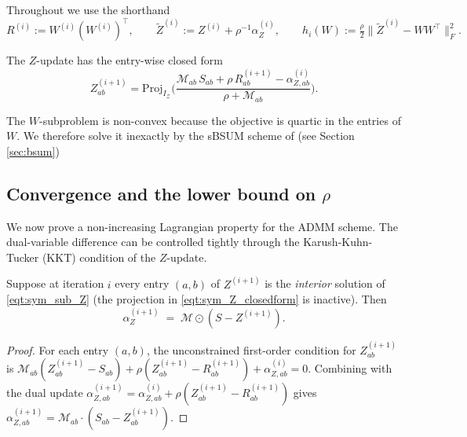 \documentclass{article}
\begin{document}
Throughout we use the shorthand
\begin{equation}
R^{(i)} := W^{(i)}(W^{(i)})^{\top},\qquad
\widetilde Z^{(i)} := Z^{(i)} + \rho^{-1}\alpha_Z^{(i)},\qquad
h_i(W) := \tfrac{\rho}{2}\bigl\|\widetilde Z^{(i)} - W W^{\top}\bigr\|_F^2.
\end{equation}

The $Z$-update has the entry-wise closed form
\begin{equation}
Z^{(i+1)}_{ab}
= \mathrm{Proj}_{I_{\mathcal{Z}}}\!\Biggl(
  \frac{\mathcal{M}_{ab}\,S_{ab} + \rho\,R^{(i+1)}_{ab} - \alpha_{Z,ab}^{(i)}}{\rho + \mathcal{M}_{ab}}
\Biggr).
\label{eqt:sym_Z_closedform}
\end{equation}

The $W$-subproblem is non-convex because the objective is quartic in the entries of $W$. We therefore solve it inexactly by the sBSUM scheme of \citep{Shi2017} (see Section \ref{sec:bsum})

\subsection{Convergence and the lower bound on \texorpdfstring{$\rho$}{rho}}

We now prove a non-increasing Lagrangian property for the ADMM scheme. The dual-variable difference can be controlled tightly through the Karush-Kuhn-Tucker (KKT) condition of the $Z$-update.


\begin{lemma}
\label{lem:sym_KKT_alpha}
Suppose at iteration $i$ every entry $(a,b)$ of $Z^{(i+1)}$ is the
\emph{interior} solution of \eqref{eqt:sym_sub_Z} (the projection in \eqref{eqt:sym_Z_closedform} is inactive). Then
\begin{equation}
\alpha_Z^{(i+1)} \;=\; \mathcal{M} \odot (S - Z^{(i+1)}).
\label{eqt:sym_KKT_alpha}
\end{equation}
\end{lemma}

\begin{proof}
For each entry $(a,b)$, the unconstrained first-order condition for $Z_{ab}^{(i+1)}$ is $\mathcal{M}_{ab}(Z_{ab}^{(i+1)} - S_{ab}) + \rho(Z_{ab}^{(i+1)} - R_{ab}^{(i+1)}) + \alpha_{Z,ab}^{(i)} = 0$. Combining with the dual update $\alpha_{Z,ab}^{(i+1)} = \alpha_{Z,ab}^{(i)} + \rho(Z_{ab}^{(i+1)} - R_{ab}^{(i+1)})$ gives $\alpha_{Z,ab}^{(i+1)} = \mathcal{M}_{ab} \cdot (S_{ab} - Z_{ab}^{(i+1)})$.
\end{proof}
\end{document}
